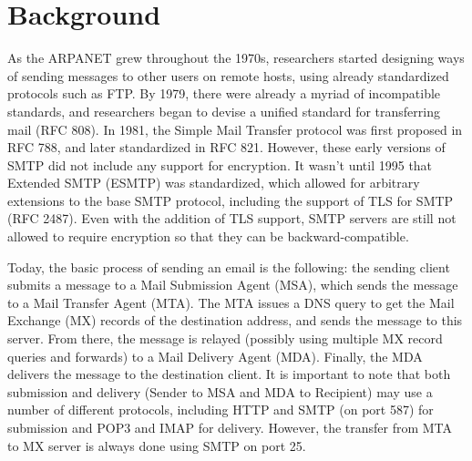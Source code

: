 \section{Background}
As the ARPANET grew throughout the 1970s, researchers started designing ways of 
sending messages to other users on remote hosts, using already standardized 
protocols such as FTP.  By 1979, there were already a myriad of incompatible 
standards, and researchers began to devise a unified standard for transferring 
mail (RFC 808).  In 1981, the Simple Mail Transfer protocol was first proposed 
in RFC 788, and later standardized in RFC 821. However, these early versions of 
SMTP did not include any support for encryption\cite{821}. It wasn't until 1995 that 
Extended SMTP (ESMTP) was standardized, which allowed for arbitrary extensions 
to the base SMTP protocol, including the support of TLS for SMTP (RFC 2487).  
Even with the addition of TLS support, SMTP servers are still not allowed to 
require encryption so that they can be backward-compatible\cite{2487}.

Today, the basic process of sending an email is the following: the sending 
client submits a message to a Mail Submission Agent (MSA), which sends the
message to a Mail Transfer Agent (MTA).  The MTA issues a DNS query to get the 
Mail Exchange (MX) records of the destination address, and sends the message to 
this server.  From there, the message is relayed (possibly using multiple MX 
record queries and forwards) to a Mail Delivery Agent (MDA).  Finally, the MDA 
delivers the message to the destination client.  It is important to note that 
both submission and delivery (Sender to MSA and MDA to Recipient) may use a 
number of different protocols, including HTTP and SMTP (on port 587) for 
submission and POP3 and IMAP for delivery.  However, the transfer from MTA to 
MX server is always done using SMTP on port 25.
